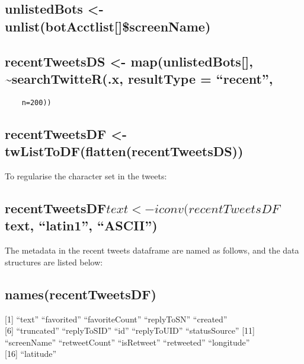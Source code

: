 \documentclass[]{article}
\begin{document}
\hypertarget{unlistedbots---unlistbotacctlistscreenname}{%
\subsection{unlistedBots \textless{}-
unlist(botAcctlist{[}{]}\$screenName)}\label{unlistedbots---unlistbotacctlistscreenname}}

\hypertarget{recenttweetsds---mapunlistedbots-searchtwitter.x-resulttype-recent}{%
\subsection{recentTweetsDS \textless{}- map(unlistedBots{[}{]},
\textasciitilde{}searchTwitteR(.x, resultType =
``recent'',}\label{recenttweetsds---mapunlistedbots-searchtwitter.x-resulttype-recent}}

\begin{verbatim}
    n=200))
\end{verbatim}

\hypertarget{recenttweetsdf---twlisttodfflattenrecenttweetsds}{%
\subsection{recentTweetsDF \textless{}-
twListToDF(flatten(recentTweetsDS))}\label{recenttweetsdf---twlisttodfflattenrecenttweetsds}}

To regularise the character set in the tweets:

\hypertarget{recenttweetsdftext---iconvrecenttweetsdftext-latin1-ascii}{%
\subsection{\texorpdfstring{recentTweetsDF\(text <- iconv(recentTweetsDF\)text,
``latin1'',
``ASCII'')}{recentTweetsDFtext \textless{}- iconv(recentTweetsDFtext, ``latin1'', ``ASCII'')}}\label{recenttweetsdftext---iconvrecenttweetsdftext-latin1-ascii}}

The metadata in the recent tweets dataframe are named as follows, and
the data structures are listed below:

\hypertarget{namesrecenttweetsdf}{%
\subsection{names(recentTweetsDF)}\label{namesrecenttweetsdf}}

{[}1{]} ``text'' ``favorited'' ``favoriteCount'' ``replyToSN''
``created''\\
{[}6{]} ``truncated'' ``replyToSID'' ``id'' ``replyToUID''
``statusSource'' {[}11{]} ``screenName'' ``retweetCount'' ``isRetweet''
``retweeted'' ``longitude''\\
{[}16{]} ``latitude''
\end{document}
